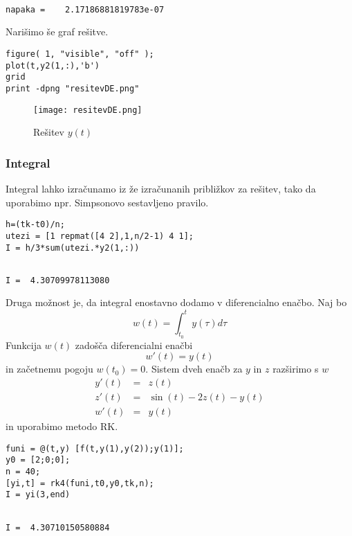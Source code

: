 \documentclass[11pt]{article}
\begin{document}
\begin{verbatim}

napaka =    2.17186881819783e-07
\end{verbatim}
Narišimo še graf rešitve.
\begin{verbatim}
figure( 1, "visible", "off" );
plot(t,y2(1,:),'b')
grid
print -dpng "resitevDE.png"
\end{verbatim}
\begin{figure}[htb]
\centering
\texttt{[image: resitevDE.png]}
\caption{Rešitev \(y(t)\)}
\end{figure}
\subsubsection{Integral}
\label{sec:orgheadline6}
Integral lahko izračunamo iz že izračunanih približkov za rešitev, tako da
uporabimo npr. Simpsonovo sestavljeno pravilo.
\begin{verbatim}
h=(tk-t0)/n;
utezi = [1 repmat([4 2],1,n/2-1) 4 1];
I = h/3*sum(utezi.*y2(1,:))
\end{verbatim}

\begin{verbatim}

I =  4.30709978113080
\end{verbatim}

Druga možnost je, da integral enostavno dodamo v diferencialno enačbo. Naj bo
\[w(t) = \int_{t_0}^t y(\tau)d\tau\]
Funkcija \(w(t)\) zadošča diferencialni enačbi 
\[w'(t)=y(t)\] in začetnemu pogoju \(w(t_0)=0\). Sistem dveh enačb za \(y\) in \(z\)
razširimo s \(w\)
\begin{eqnarray*}
  y'(t) &=& z(t)\\
 z'(t) &=& \sin(t)-2z(t)-y(t)\\
 w'(t) &=& y(t)
\end{eqnarray*}
in uporabimo metodo RK.
\begin{verbatim}
funi = @(t,y) [f(t,y(1),y(2));y(1)];
y0 = [2;0;0];
n = 40;
[yi,t] = rk4(funi,t0,y0,tk,n);
I = yi(3,end)
\end{verbatim}

\begin{verbatim}

I =  4.30710150580884
\end{verbatim}
\end{document}
